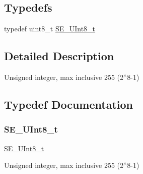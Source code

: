 \subsection*{Typedefs}
\begin{DoxyCompactItemize}
\item 
typedef uint8\+\_\+t \hyperlink{group__UInt8_gaf7c365a1acfe204e3a67c16ed44572f5}{S\+E\+\_\+\+U\+Int8\+\_\+t}
\end{DoxyCompactItemize}


\subsection{Detailed Description}
Unsigned integer, max inclusive 255 (2$^\wedge$8-\/1) 

\subsection{Typedef Documentation}
\mbox{\label{group__UInt8_gaf7c365a1acfe204e3a67c16ed44572f5}} 
\subsubsection{\texorpdfstring{S\+E\+\_\+\+U\+Int8\+\_\+t}{SE\_UInt8\_t}}
{\footnotesize\ttfamily \hyperlink{group__UInt8_gaf7c365a1acfe204e3a67c16ed44572f5}{S\+E\+\_\+\+U\+Int8\+\_\+t}}

Unsigned integer, max inclusive 255 (2$^\wedge$8-\/1) 